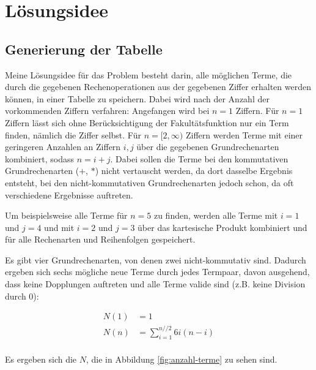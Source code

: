 \documentclass[a4paper,10pt,ngerman]{scrartcl}
\title{\Aufgabe}
\author{\Name\\Team-ID: \Einsendenummer}
\date{\today}
\begin{document}
\maketitle
\tableofcontents

\section{Lösungsidee}
\subsection{Generierung der Tabelle}
Meine Lösungsidee für das Problem besteht darin, alle möglichen Terme, die durch die gegebenen Rechenoperationen aus der gegebenen Ziffer erhalten werden können, in einer Tabelle zu speichern.
Dabei wird nach der Anzahl der vorkommenden Ziffern verfahren:
Angefangen wird bei $n=1$ Ziffern.
Für $n=1$ Ziffern lässt sich ohne Berücksichtigung der Fakultätsfunktion nur ein Term finden, nämlich die Ziffer selbst.
Für $n=[2, \infty)$ Ziffern werden Terme mit einer geringeren Anzahlen an Ziffern $i,j$ über die gegebenen Grundrechenarten kombiniert, sodass $n=i+j$.
Dabei sollen die Terme bei den kommutativen Grundrechenarten ($+$, $*$) nicht vertauscht werden, da dort dasselbe Ergebnis entsteht, bei den nicht-kommutativen Grundrechenarten jedoch schon, da oft verschiedene Ergebnisse auftreten.

Um beispielsweise alle Terme für $n=5$ zu finden, werden alle Terme mit $i=1$ und $j=4$ und mit $i=2$ und $j=3$ über das kartesische Produkt kombiniert und für alle Rechenarten und Reihenfolgen gespeichert.

Es gibt vier Grundrechenarten, von denen zwei nicht-kommutativ sind.
Dadurch ergeben sich sechs mögliche neue Terme durch jedes Termpaar, davon ausgehend, dass keine Dopplungen auftreten und alle Terme valide sind (z.B. keine Division durch 0):

\begin{align*}
N(1) &= 1 \\
N(n) &= \sum_{i=1}^{n // 2}6i(n-i) \\
\end{align*}

Es ergeben sich die $N$, die in Abbildung \ref{fig:anzahl-terme} zu sehen sind.
\end{document}
